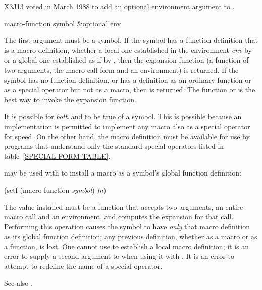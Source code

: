 \begin{newer}
X3J13 voted in March 1988 
to add an optional environment argument to .

\begin{defun}[Function]
macro-function symbol &optional env

The first argument must be a symbol.  If the symbol has a function definition
that is a macro definition, whether a local one established in the
environment \emph{env} by  or a global one established as
if by ,
then the expansion function
(a function of two arguments, the macro-call form and an environment)
is returned.
If the symbol has no function definition, or has a definition
as an ordinary function or as a special operator but not as a macro, then
{\false} is returned.  The function  or 
is the best way to invoke the expansion function.

It is possible for \emph{both}  and 
to be true of a symbol.  This is possible because an implementation is
permitted to implement any macro also as a special operator for speed.
On the other hand, the macro definition must be available
for use by programs that understand only the standard special operators
listed in table~\ref{SPECIAL-FORM-TABLE}.

 may be used with  to install
a macro as a symbol's global function definition:
\begin{lisp}
(setf (macro-function \emph{symbol}) \emph{fn})
\end{lisp}
The value installed must be a function that accepts two arguments,
an entire macro call and an environment, and computes the expansion for that call.
Performing this operation causes the symbol to have \emph{only} that
macro definition as its global function definition; any previous
definition, whether as a macro or as a function, is lost.
One cannot use  to establish a local macro definition;
it is an error to supply a second argument to 
when using it with .
It is an error to attempt to redefine the name of a special operator.

See also .
\end{defun}
\end{newer}

